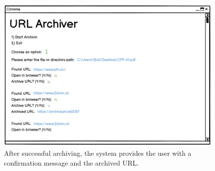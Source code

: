 \begin{figure}[h!]
    \centering
    \includegraphics[width=1\textwidth]{pictures/UX-Prototype/Prototype_7}
    \caption{After successful archiving, the system provides the user with a confirmation message and the archived URL.}
    \label{fig:Process_Continuation}
\end{figure}
\clearpage

